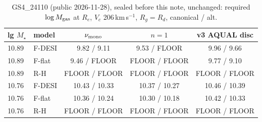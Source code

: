 \begin{table}[h]\centering\small\caption{GS4\_24110 (public 2026-11-28), sealed before this note, unchanged: required $\log M_{\rm gas}$ at $R_e$, $V_c$ 206\,km\,s$^{-1}$, $R_g=R_d$, canonical / alt.}\label{t:gs4}\begin{tabular}{llccc}\toprule
lg $M_\star$ & model & $\nu_{\rm mono}$ & $n=1$ & v3 AQUAL disc \\ \midrule
10.89 & F-DESI & 9.82 / 9.11 & 9.53 / FLOOR & 9.96 / 9.66 \\
10.89 & F-flat & 9.46 / FLOOR & FLOOR / FLOOR & 9.77 / 9.10 \\
10.89 & R-H & FLOOR / FLOOR & FLOOR / FLOOR & FLOOR / FLOOR \\
10.76 & F-DESI & 10.43 / 10.33 & 10.37 / 10.27 & 10.46 / 10.39 \\
10.76 & F-flat & 10.36 / 10.24 & 10.30 / 10.18 & 10.42 / 10.33 \\
10.76 & R-H & FLOOR / FLOOR & FLOOR / FLOOR & FLOOR / FLOOR \\
\bottomrule\end{tabular}\end{table}
